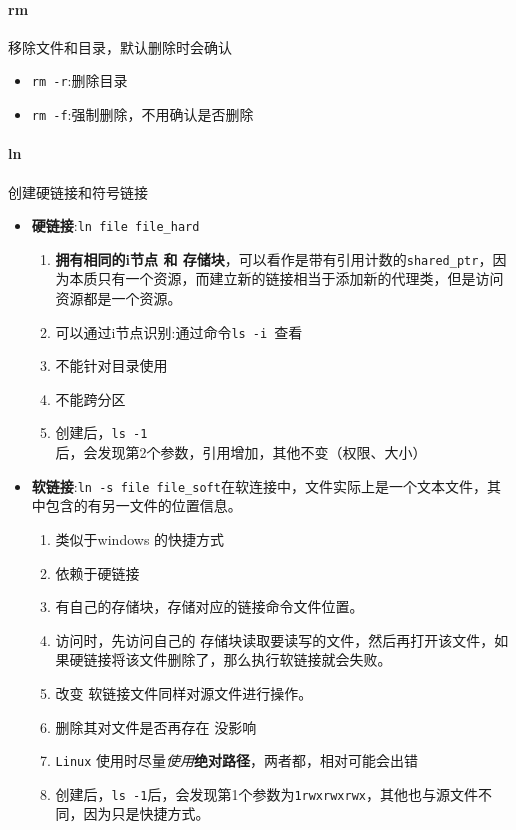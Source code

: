 \documentclass[UTF8,a4paper,12pt]{ctexbook}
\begin{document}
		\paragraph{rm} 移除文件和目录，默认删除时会确认
			\begin{itemize}[itemindent = 1em]
				\item \verb|rm -r|:删除目录
				\item \verb|rm -f|:强制删除，不用确认是否删除
			\end{itemize}

		\paragraph{ln} 创建硬链接和符号链接
			\begin{itemize}
				\item \textbf{硬链接}:\verb|ln file file_hard|
					\begin{enumerate}
						\item \textbf{拥有相同的i节点  和 存储块}，可以看作是带有引用计数的\verb|shared_ptr|，因为本质只有一个资源，而建立新的链接相当于添加新的代理类，但是访问资源都是一个资源。
						\item 可以通过i节点识别:通过命令\verb|ls -i |查看
						\item 不能针对目录使用
						\item 不能跨分区
						\item 创建后，\verb|ls -1|后，会发现第2个参数，引用增加，其他不变（权限、大小）
					\end{enumerate}
					
				\item \textbf{软链接}:\verb|ln -s file file_soft|在软连接中，文件实际上是一个文本文件，其中包含的有另一文件的位置信息。
					\begin{enumerate}
						\item 类似于windows 的快捷方式
						\item 依赖于硬链接
						\item 有自己的存储块，存储对应的链接命令文件位置。
						\item 访问时，先访问自己的 存储块读取要读写的文件，然后再打开该文件，如果硬链接将该文件删除了，那么执行软链接就会失败。
						\item 改变 软链接文件同样对源文件进行操作。
						\item 删除其对文件是否再存在 没影响
						
						\item \verb|Linux| 使用时尽量\textit{使用}\textbf{绝对路径}，两者都，相对可能会出错
						\item 创建后，\verb|ls -1|后，会发现第1个参数为\verb|1rwxrwxrwx|，其他也与源文件不同，因为只是快捷方式。
					\end{enumerate}
			\end{itemize}
			
\end{document}
